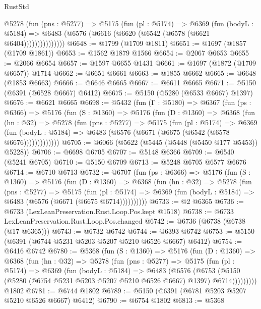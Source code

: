 \begin{lexlean}{RustStd}
\begin{coremodule}
              @5278
                (fun (pns : @5277) =>
                @5175
                  (fun (pl : @5174) =>
                  @6369
                    (fun (bodyL : @5184) =>
                    @6483 (@6576 (@6616 (@6620 (@6542 (@6578 (@6621 @6404)))))))))))))))
@6648 := @1799 (@1709 @1811)
@6651 := @1697 (@1857 (@1709 @1861))
@6653 := @1562 @1879 @1566
@6654 := @2067 @6653
@6655 := @2066 @6654
@6657 := @1597 @6655 @1431
@6661 := @1697 (@1872 (@1709 @6657)) @1714
@6662 := @6651 @6661
@6663 := @1855 @6662
@6665 := @6648 (@1853 @6663)
@6666 := @6646 @6665
@6667 := @6611 @6665
@6671 := @5150 (@6391 (@6528 @6667) @6412)
@6675 := @5150 (@5280 (@6533 @6667) @1397)
@6676 := @6621 @6665
@6698 := @5432
    (fun (Γ : @5180) =>
    @6367
      (fun (ps : @6366) =>
      @5176
        (fun (S : @1360) =>
        @5176
          (fun (D : @1360) =>
          @6368
            (fun (hn : @32) =>
            @5278
              (fun (pns : @5277) =>
              @5175
                (fun (pl : @5174) =>
                @6369
                  (fun (bodyL : @5184) =>
                  @6483 (@6576 (@6671 (@6675 (@6542 (@6578 @6676)))))))))))))
@6705 := @6066 (@5622 (@5445 (@5448 (@5450 @177 @5453)) @5228))
@6706 := @6698 @6705
@6707 := @5148 @6366
@6709 := @6540 (@5241 @6705)
@6710 := @5150 @6709
@6713 := @5248 @6705 @6577 @6676
@6714 := @6710 @6713
@6732 := @6707
    (fun (ps : @6366) =>
    @5176
      (fun (S : @1360) =>
      @5176
        (fun (D : @1360) =>
        @6368
          (fun (hn : @32) =>
          @5278
            (fun (pns : @5277) =>
            @5175
              (fun (pl : @5174) =>
              @6369 (fun (bodyL : @5184) => @6483 (@6576 (@6671 (@6675 @6714))))))))))
@6733 := @2 @6365
@6736 := @6733 (LexLeanPreservation.Rust.Loop.Pos.kept @1518)
@6738 := @6733 LexLeanPreservation.Rust.Loop.Pos.changed
@6742 := @6736 (@6738 (@6738 (@17 @6365)))
@6743 := @6732 @6742
@6744 := @6393 @6742
@6753 := @5150 (@6391 (@6744 @5231 @5203 @5207 @5210 @6526 @6667) @6412)
@6754 := @6416 @6742
@6780 := @5368
    (fun (S : @1360) =>
    @5176
      (fun (D : @1360) =>
      @6368
        (fun (hn : @32) =>
        @5278
          (fun (pns : @5277) =>
          @5175
            (fun (pl : @5174) =>
            @6369
              (fun (bodyL : @5184) =>
              @6483
                (@6576
                  (@6753
                    (@5150 (@5280 (@6754 @5231 @5203 @5207 @5210 @6526 @6667) @1397) @6714)))))))))
    @1802
@6781 := @6744 @1802
@6789 := @5150 (@6391 (@6781 @5203 @5207 @5210 @6526 @6667) @6412)
@6790 := @6754 @1802
@6813 := @5368

\end{coremodule}
\end{lexlean}
